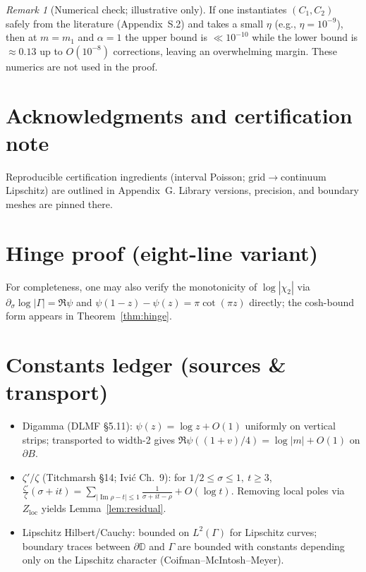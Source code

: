 \documentclass[11pt]{article}
\numberwithin{equation}{section}
\theoremstyle{remark}
\newtheorem{remark}[theorem]{Remark}
\newcommand{\D}{\mathbb{D}}
\DeclareMathOperator{\Imag}{Im}
\newcommand{\Zloc}{Z_{\mathrm{loc}}}
\begin{document}
\begin{remark}[Numerical check; illustrative only]
If one instantiates $(C_1,C_2)$ safely from the literature (Appendix~S.2) and takes a small $\eta$ (e.g., $\eta=10^{-9}$), then at $m=m_1$ and $\alpha=1$ the upper bound is $\ll 10^{-10}$ while the lower bound is $\approx 0.13$ up to $O(10^{-8})$ corrections, leaving an overwhelming margin. These numerics are not used in the proof.
\end{remark}

\section*{Acknowledgments and certification note}
Reproducible certification ingredients (interval Poisson; grid$\to$continuum Lipschitz) are outlined in Appendix~G. Library versions, precision, and boundary meshes are pinned there.


\appendix

\section{Hinge proof (eight-line variant)}
For completeness, one may also verify the monotonicity of $\log|\chi_2|$ via $\partial_\sigma\log|\Gamma|=\Re\psi$ and $\psi(1-z)-\psi(z)=\pi\cot(\pi z)$ directly; the cosh-bound form appears in Theorem~\ref{thm:hinge}.

\section{Constants ledger (sources \& transport)}
\begin{itemize}
\item Digamma (DLMF §5.11): $\psi(z)=\log z+O(1)$ uniformly on vertical strips; transported to width-2 gives $\Re\psi((1+v)/4)=\log|m|+O(1)$ on $\partial B$.
\item $\zeta'/\zeta$ (Titchmarsh §14; Ivi\'c Ch.~9): for $1/2\le \sigma\le 1,\ t\ge 3$,
$\displaystyle \frac{\zeta'}{\zeta}(\sigma+it)=\sum_{|\Imag\rho-t|\le 1}\frac{1}{\sigma+it-\rho}+O(\log t)$.
Removing local poles via $\Zloc$ yields Lemma~\ref{lem:residual}.
\item Lipschitz Hilbert/Cauchy: bounded on $L^2(\Gamma)$ for Lipschitz curves; boundary traces between $\partial\D$ and $\Gamma$ are bounded with constants depending only on the Lipschitz character (Coifman--McIntosh--Meyer).
\end{itemize}
\end{document}
